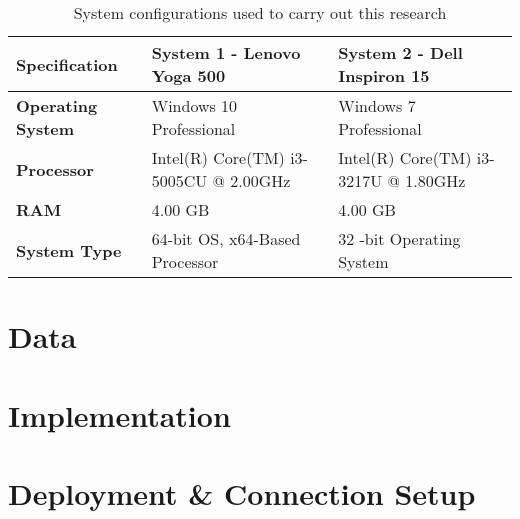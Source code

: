 \begin{table}[!htb]
\centering
\caption{System configurations used to carry out this research}
\label{osc4}
\begin{tabular}{|p{3cm}|p{5cm}|p{5cm}|}
\toprule
\textbf{Specification}    & \textbf{System 1 - Lenovo Yoga 500}   & \textbf{System 2 - Dell Inspiron 15} \\ \midrule
\textbf{Operating System} & Windows 10 Professional               & Windows 7 Professional               \\
\textbf{Processor}        & Intel(R) Core(TM) i3-5005CU @ 2.00GHz & Intel(R) Core(TM) i3-3217U @ 1.80GHz \\
\textbf{RAM}              & 4.00 GB                               & 4.00 GB                              \\
\textbf{System Type}      & 64-bit OS, x64-Based Processor        & 32 -bit Operating System             \\ \bottomrule
\end{tabular}
\end{table}


\section{Data}\label{ch4.3}
\section{Implementation}\label{}
\section{Deployment \& Connection Setup}
